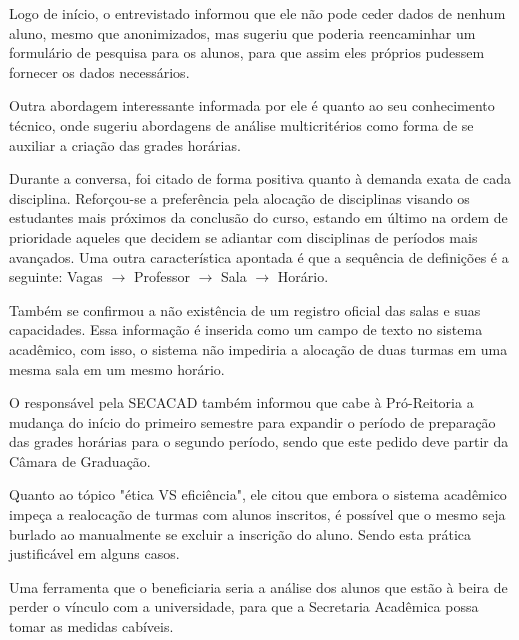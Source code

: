 
        Logo de início, o entrevistado informou que ele não pode ceder dados de nenhum aluno, mesmo que anonimizados, mas sugeriu que poderia reencaminhar um formulário de pesquisa para os alunos, para que assim eles próprios pudessem fornecer os dados necessários.

        Outra abordagem interessante informada por ele é quanto ao seu conhecimento técnico, onde sugeriu abordagens de análise multicritérios como forma de se auxiliar a criação das grades horárias.

        Durante a conversa, foi citado de forma positiva quanto à demanda exata de cada disciplina. Reforçou-se a preferência pela alocação de disciplinas visando os estudantes mais próximos da conclusão do curso, estando em último na ordem de prioridade aqueles que decidem se adiantar com disciplinas de períodos mais avançados. Uma outra característica apontada é que a sequência de definições é a seguinte: Vagas $\rightarrow$ Professor $\rightarrow$ Sala $\rightarrow$ Horário.

        Também se confirmou a não existência de um registro oficial das salas e suas capacidades. Essa informação é inserida como um campo de texto no sistema acadêmico, com isso, o sistema não impediria a alocação de duas turmas em uma mesma sala em um mesmo horário.

        O responsável pela SECACAD também informou que cabe à Pró-Reitoria a mudança do início do primeiro semestre para expandir o período de preparação das grades horárias para o segundo período, sendo que este pedido deve partir da Câmara de Graduação.

        Quanto ao tópico "ética VS eficiência", ele citou que embora o sistema acadêmico impeça a realocação de turmas com alunos inscritos, é possível que o mesmo seja burlado ao manualmente se excluir a inscrição do aluno. Sendo esta prática justificável em alguns casos.

        Uma ferramenta que o beneficiaria seria a análise dos alunos que estão à beira de perder o vínculo com a universidade, para que a Secretaria Acadêmica possa tomar as medidas cabíveis.

